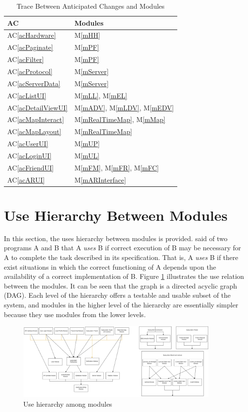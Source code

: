 \documentclass[12pt, titlepage]{article}
\newcommand{\acref}[1]{AC\ref{#1}}
\newcommand{\mref}[1]{M\ref{#1}}
\begin{document}
\begin{table}[H]
\centering
\begin{tabular}{p{} p{}}
\toprule
\textbf{AC} & \textbf{Modules}\\
\midrule
\acref{acHardware} & \mref{mHH}\\
\acref{acPaginate} & \mref{mPF}\\
\acref{acFilter} & \mref{mPF}\\
\acref{acProtocol} & \mref{mServer}\\
\acref{acServerData} & \mref{mServer}\\
\acref{acListUI} & \mref{mLL}, \mref{mEL}\\
\acref{acDetailViewUI} & \mref{mADV}, \mref{mLDV}, \mref{mEDV}\\
\acref{acMapInteract} & \mref{mRealTimeMap}, \mref{mMap}\\
\acref{acMapLayout} & \mref{mRealTimeMap}\\
\acref{acUserUI} & \mref{mUP}\\
\acref{acLoginUI} & \mref{mUL}\\
\acref{acFriendUI} & \mref{mFM}, \mref{mFR}, \mref{mFC}\\
\acref{acARUI} & \mref{mARInterface}\\
\bottomrule
\end{tabular}
\caption{Trace Between Anticipated Changes and Modules}
\label{TblACT}
\end{table}

\section{Use Hierarchy Between Modules} \label{SecUse}

In this section, the uses hierarchy between modules is
provided. \citet{Parnas1978} said of two programs A and B that A {\em uses} B if
correct execution of B may be necessary for A to complete the task described in
its specification. That is, A {\em uses} B if there exist situations in which
the correct functioning of A depends upon the availability of a correct
implementation of B.  Figure \ref{FigUH} illustrates the use relation between
the modules. It can be seen that the graph is a directed acyclic graph
(DAG). Each level of the hierarchy offers a testable and usable subset of the
system, and modules in the higher level of the hierarchy are essentially simpler
because they use modules from the lower levels.

\begin{figure}[H]
\centering
\includegraphics[width=0.9\textwidth]{UsesHierarchy.png}
\caption{Use hierarchy among modules}
\label{FigUH}
\end{figure}
\end{document}
